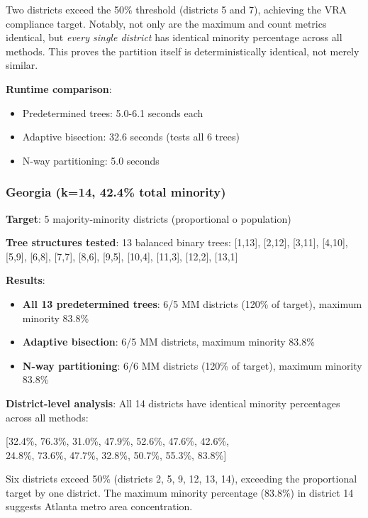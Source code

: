Two districts exceed the 50\% threshold (districts 5 and 7), achieving the VRA compliance target. Notably, not only are the maximum and count metrics identical, but \textit{every single district} has identical minority percentage across all methods. This proves the partition itself is deterministically identical, not merely similar.

\textbf{Runtime comparison}:
\begin{itemize}
\item Predetermined trees: 5.0-6.1 seconds each
\item Adaptive bisection: 32.6 seconds (tests all 6 trees)
\item N-way partitioning: 5.0 seconds
\end{itemize}

\subsubsection{Georgia (k=14, 42.4\% total minority)}

\textbf{Target}: 5 majority-minority districts (proportional 	o population)

\textbf{Tree structures tested}: 13 balanced binary trees: [1,13], [2,12], [3,11], [4,10], [5,9], [6,8], [7,7], [8,6], [9,5], [10,4], [11,3], [12,2], [13,1]

\textbf{Results}:
\begin{itemize}
\item \textbf{All 13 predetermined trees}: 6/5 MM districts (120\% of target), maximum minority 83.8\%
\item \textbf{Adaptive bisection}: 6/5 MM districts, maximum minority 83.8\%
\item \textbf{N-way partitioning}: 6/6 MM districts (120\% of target), maximum minority 83.8\%
\end{itemize}

\textbf{District-level analysis}: All 14 districts have identical minority percentages across all methods:
\begin{center}
[32.4\%, 76.3\%, 31.0\%, 47.9\%, 52.6\%, 47.6\%, 42.6\%, \\
24.8\%, 73.6\%, 47.7\%, 32.8\%, 50.7\%, 55.3\%, 83.8\%]
\end{center}

Six districts exceed 50\% (districts 2, 5, 9, 12, 13, 14), exceeding the proportional target by one district. The maximum minority percentage (83.8\%) in district 14 suggests Atlanta metro area concentration.

